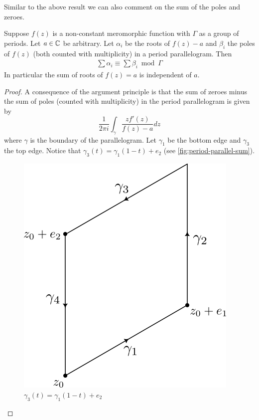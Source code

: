 Similar to the above result we can also comment on the sum of the poles and zeroes.
\begin{proposition}
    Suppose $f(z)$ is a non-constant meromorphic function with $\Gamma$ as a group of periods. Let $a \in \mathbb{C}$ be arbitrary. Let $\alpha_i$ be the roots of $f(z) - a$ and $\beta_i$ the poles of $f(z)$ (both counted with multiplicity) in a period parallelogram. Then
    \begin{align*}
        \sum \alpha_i \equiv \sum \beta_i \bmod \Gamma
    \end{align*}
    In particular the sum of roots of $f(z) = a$ is independent of $a$. 
\end{proposition}
\begin{proof}
    A consequence of the argument principle is that the sum of zeroes minus the sum of poles (counted with multiplicity) in the period parallelogram is given by 
    $$ \frac{1}{2\pi i} \int_\gamma \frac{zf'(z)}{f(z) - a}dz$$
    where $\gamma$ is the boundary of the parallelogram. Let $\gamma_1$ be the bottom edge and $\gamma_3$ the top edge. Notice that $\gamma_3(t) = \gamma_1(1 - t) + e_2$ (see \autoref{fig:period-parallel-sum}). 
    \begin{figure}[ht]
        \centering
        \includegraphics{Images/period_parallel_sum_of_poles.png}
        \caption{$\gamma_3(t) = \gamma_1(1 - t) + e_2$}
        \label{fig:period-parallel-sum}
    \end{figure}
    

\end{proof}
